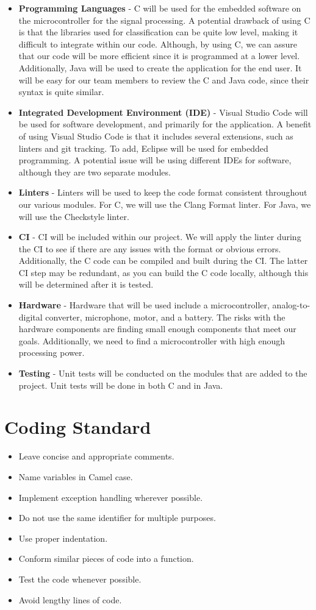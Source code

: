 \documentclass{article}
\begin{document}
\begin{itemize}
	\item \textbf{Programming Languages} - C will be used for the embedded software on the microcontroller for the signal processing. A potential drawback of using C is that the libraries used for classification can be quite low level, making it difficult to integrate within our code. Although, by using C, we can assure that our code will be more efficient since it is programmed at a lower level. Additionally, Java will be used to create the application for the end user. It will be easy for our team members to review the C and Java code, since their syntax is quite similar.
	\item \textbf{Integrated Development Environment (IDE)} - Visual Studio Code will be used for software development, and primarily for the application. A benefit of using Visual Studio Code is that it includes several extensions, such as linters and git tracking. To add, Eclipse will be used for embedded programming. A potential issue will be using different IDEs for software, although they are two separate modules.
	\item \textbf{Linters} - Linters will be used to keep the code format consistent throughout our various modules. For C, we will use the Clang Format linter. For Java, we will use the Checkstyle linter.
	\item \textbf{CI} - CI will be included within our project. We will apply the linter during the CI to see if there are any issues with the format or obvious errors. Additionally, the C code can be compiled and built during the CI. The latter CI step may be redundant, as you can build the C code locally, although this will be determined after it is tested.
	\item \textbf{Hardware} - Hardware that will be used include a microcontroller, analog-to-digital converter, microphone, motor, and a battery. The risks with the hardware components are finding small enough components that meet our goals. Additionally, we need to find a microcontroller with high enough processing power.
	\item \textbf{Testing} - Unit tests will be conducted on the modules that are added to the project. Unit tests will be done in both C and in Java.
\end{itemize}

\section{Coding Standard}
\begin{itemize}
	\item Leave concise and appropriate comments.
	\item Name variables in Camel case.
	\item Implement exception handling wherever possible.
	\item Do not use the same identifier for multiple purposes.
	\item Use proper indentation.
	\item Conform similar pieces of code into a function.
	\item Test the code whenever possible.
	\item Avoid lengthy lines of code.
\end{itemize}
\end{document}
